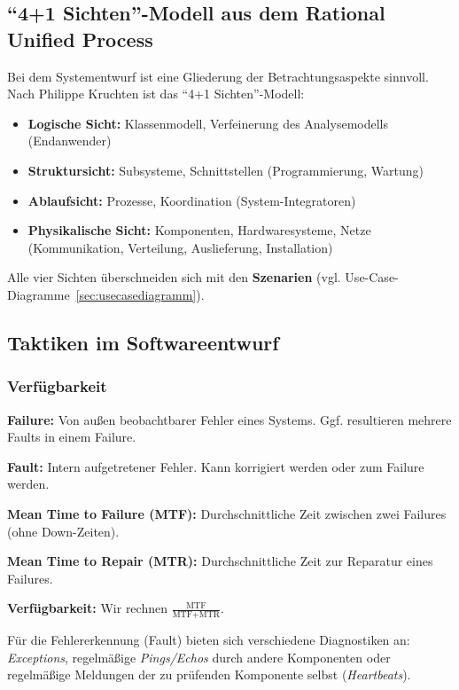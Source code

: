 \documentclass{panikzettel}
\begin{document}
\subsection{``4+1 Sichten''-Modell aus dem Rational Unified Process}

Bei dem Systementwurf ist eine Gliederung der Betrachtungsaspekte sinnvoll. Nach Philippe Kruchten ist das ``4+1 Sichten''-Modell:

\begin{itemize}
\item \textbf{Logische Sicht:} Klassenmodell, Verfeinerung des Analysemodells (Endanwender)
\item \textbf{Struktursicht:} Subsysteme, Schnittstellen (Programmierung, Wartung)
\item \textbf{Ablaufsicht:} Prozesse, Koordination (System-Integratoren)
\item \textbf{Physikalische Sicht:} Komponenten, Hardwaresysteme, Netze (Kommunikation, Verteilung, Auslieferung, Installation)
\end{itemize}

Alle vier Sichten überschneiden sich mit den \textbf{Szenarien} (vgl. Use-Case-Diagramme~\ref{sec:usecasediagramm}).

\subsection{Taktiken im Softwareentwurf}

\subsubsection{Verfügbarkeit}

\textbf{Failure:} Von außen beobachtbarer Fehler eines Systems. Ggf. resultieren mehrere Faults in einem Failure.

\textbf{Fault:} Intern aufgetretener Fehler. Kann korrigiert werden oder zum Failure werden.

\textbf{Mean Time to Failure (MTF):} Durchschnittliche Zeit zwischen zwei Failures (ohne Down-Zeiten).

\textbf{Mean Time to Repair (MTR):} Durchschnittliche Zeit zur Reparatur eines Failures.

\textbf{Verfügbarkeit:} Wir rechnen $\frac{\textrm{MTF}}{\textrm{MTF}+\textrm{MTR}}$.

Für die Fehlererkennung (Fault) bieten sich verschiedene Diagnostiken an: \emph{Exceptions}, regelmäßige \emph{Pings/Echos} durch andere Komponenten oder regelmäßige Meldungen der zu prüfenden Komponente selbst (\emph{Heartbeats}).
\end{document}
